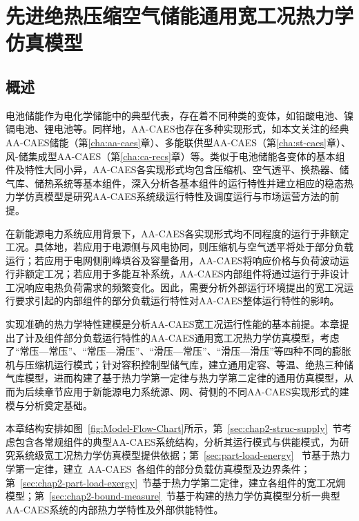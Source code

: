 \chapter{先进绝热压缩空气储能通用宽工况热力学仿真模型}
\label{cha:simulation}

\section{概述}
\label{sec:chap2-intro}

电池储能作为电化学储能中的典型代表，存在着不同种类的变体，如铅酸电池、镍镉电池、锂电池等\cite{Battery-Nature-15, ESS-Review-09}。同样地，AA-CAES也存在多种实现形式，如本文关注的经典AA-CAES储能（第\ref{cha:aa-caes}章）、多能联供型AA-CAES（第\ref{cha:st-caes}章）、风-储集成型AA-CAES（第\ref{cha:ca-recs}章）等。类似于电池储能各变体的基本组件及特性大同小异，AA-CAES各实现形式均包含压缩机、空气透平、换热器、储气库、储热系统等基本组件，深入分析各基本组件的运行特性并建立相应的稳态热力学仿真模型是研究AA-CAES系统级运行特性及调度运行与市场运营方法的前提。

在新能源电力系统应用背景下，AA-CAES各实现形式均不同程度的运行于非额定工况。具体地，若应用于电源侧与风电协同，则压缩机与空气透平将处于部分负载运行；若应用于电网侧削峰填谷及容量备用，AA-CAES将响应价格与负荷波动运行非额定工况；若应用于多能互补系统，AA-CAES内部组件将通过运行于非设计工况响应电热负荷需求的频繁变化。因此，需要分析外部运行环境提出的宽工况运行要求引起的内部组件的部分负载运行特性对AA-CAES整体运行特性的影响。

实现准确的热力学特性建模是分析AA-CAES宽工况运行性能的基本前提。本章提出了计及组件部分负载运行特性的AA-CAES通用宽工况热力学仿真模型，考虑了“常压—常压”、“常压—滑压”、“滑压—常压”、“滑压—滑压”等四种不同的膨胀机与压缩机运行模式；针对容积控制型储气库，建立通用定容、等温、绝热三种储气库模型，进而构建了基于热力学第一定律与热力学第二定律的通用仿真模型，从而为后续章节应用于新能源电力系统源、网、荷侧的不同AA-CAES实现形式的建模与分析奠定基础。

本章结构安排如图~\ref{fig:Model-Flow-Chart}所示，第~\ref{sec:chap2-struc-supply}~节考虑包含各常规组件的典型AA-CAES系统结构，分析其运行模式与供能模式，为研究系统级宽工况热力学仿真模型提供依据；第~\ref{sec:part-load-energy}~ 节基于热力学第一定律，建立~AA-CAES~各组件的部分负载仿真模型及边界条件；第~\ref{sec:chap2-part-load-exergy}~节基于热力学第二定律，建立各组件的宽工况㶲模型；第~\ref{sec:chap2-bound-measure}~节基于构建的热力学仿真模型分析一典型 AA-CAES系统的内部热力学特性及外部供能特性。

